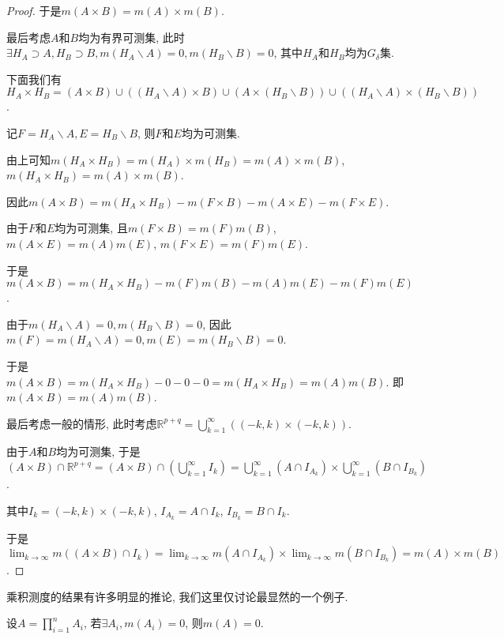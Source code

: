 \documentclass[theorem=false,mathfont=none,openany,sub3section]{easybook}
\begin{document}
\begin{proof}
  于是$m(A\times B)=m(A)\times m(B)$.\par
  最后考虑$A$和$B$均为有界可测集, 此时$\exists H_A\supset A, H_B\supset B, m(H_A\backslash A)=0, m(H_B\backslash B)=0$, 其中$H_A$和$H_B$均为$G_{\delta}$集.\par
  下面我们有$H_A\times H_B = (A\times B)\cup ((H_A\backslash A)\times B) \cup (A\times (H_B\backslash B)) \cup ((H_A\backslash A)\times (H_B\backslash B))$.\par
  记$F=H_A\backslash A, E=H_B\backslash B$, 则$F$和$E$均为可测集.\par
  由上可知$m(H_A\times H_B)=m(H_A)\times m(H_B)=m(A)\times m(B)$, $m(H_A\times H_B)=m(A)\times m(B)$.\par
  因此$m(A\times B)=m(H_A\times H_B)-m(F\times B)-m(A\times E)-m(F\times E)$.\par
  由于$F$和$E$均为可测集, 且$m(F\times B)=m(F)m(B)$, $m(A\times E)=m(A)m(E)$, $m(F\times E)=m(F)m(E)$.\par
  于是$m(A\times B)=m(H_A\times H_B)-m(F)m(B)-m(A)m(E)-m(F)m(E)$.\par
  由于$m(H_A\backslash A)=0, m(H_B\backslash B)=0$,
  因此$m(F)=m(H_A\backslash A)=0, m(E)=m(H_B\backslash B)=0$.\par
  于是$m(A\times B)=m(H_A\times H_B)-0-0-0=m(H_A\times H_B)=m(A)m(B)$. 即$m(A\times B)=m(A)m(B)$.\par
  最后考虑一般的情形, 此时考虑$\mathbb{R}^{p+q}=\bigcup_{k=1}^{\infty}\left((-k,k)\times (-k,k)\right)$.\par
  由于$A$和$B$均为可测集, 于是$(A\times B)\cap \mathbb{R}^{p+q}=(A\times B)\cap (\bigcup_{k=1}^{\infty} I_k)=\bigcup_{k=1}^{\infty} (A\cap I_{A_k})\times \bigcup_{k=1}^{\infty} (B\cap I_{B_k})$.\par
  其中$I_k=(-k,k)\times (-k,k)$, $I_{A_k}=A\cap I_k$, $I_{B_k}=B\cap I_k$.\par
  于是$\lim_{k \to \infty}m((A\times B)\cap I_k)=\lim_{k \to \infty}m(A\cap I_{A_k})\times \lim_{k \to \infty}m(B\cap I_{B_k})=m(A)\times m(B)$.\par
\end{proof}

乘积测度的结果有许多明显的推论, 我们这里仅讨论最显然的一个例子.\par

\begin{corollary}
  设$A=\prod_{i=1}^{n}A_i$, 若$\exists A_i, m(A_i)=0$, 则$m(A)=0$.\par
\end{corollary}
\end{document}
